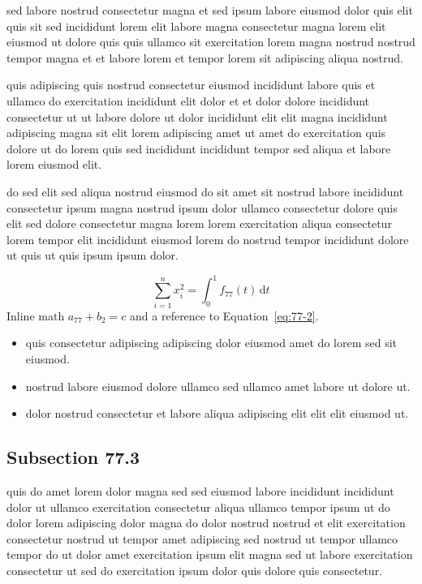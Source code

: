\documentclass{article}
\begin{document}
sed labore nostrud consectetur magna et sed ipsum labore eiusmod dolor quis elit quis sit sed incididunt lorem elit labore magna consectetur magna lorem elit eiusmod ut dolore quis quis ullamco sit exercitation lorem magna nostrud nostrud tempor magna et et labore lorem et tempor lorem sit adipiscing aliqua nostrud.

quis adipiscing quis nostrud consectetur eiusmod incididunt labore quis et ullamco do exercitation incididunt elit dolor et et dolor dolore incididunt consectetur ut ut labore dolore ut dolor incididunt elit elit magna incididunt adipiscing magna sit elit lorem adipiscing amet ut amet do exercitation quis dolore ut do lorem quis sed incididunt incididunt tempor sed aliqua et labore lorem eiusmod elit.

do sed elit sed aliqua nostrud eiusmod do sit amet sit nostrud labore incididunt consectetur ipsum magna nostrud ipsum dolor ullamco consectetur dolore quis elit sed dolore consectetur magna lorem lorem exercitation aliqua consectetur lorem tempor elit incididunt eiusmod lorem do nostrud tempor incididunt dolore ut quis ut quis ipsum ipsum dolor.

\begin{equation}\label{eq:77-2}
  \sum_{i=1}^{n} x_i^{2} = \int_0^1 f_{77}(t)\,\mathrm{d}t
\end{equation}
Inline math $a_{77} + b_{2} = c$ and a reference to Equation~\eqref{eq:77-2}.

\begin{itemize}
  \item quis consectetur adipiscing adipiscing dolor eiusmod amet do lorem sed sit eiusmod.
  \item nostrud labore eiusmod dolore ullamco sed ullamco amet labore ut dolore ut.
  \item dolor nostrud consectetur et labore aliqua adipiscing elit elit elit eiusmod ut.
\end{itemize}

\subsection{Subsection 77.3}\label{sec:77-3}
quis do amet lorem dolor magna sed sed eiusmod labore incididunt incididunt dolor ut ullamco exercitation consectetur aliqua ullamco tempor ipsum ut do dolor lorem adipiscing dolor magna do dolor nostrud nostrud et elit exercitation consectetur nostrud ut tempor amet adipiscing sed nostrud ut tempor ullamco tempor do ut dolor amet exercitation ipsum elit magna sed ut labore exercitation consectetur ut sed do exercitation ipsum dolor quis dolore quis consectetur.
\end{document}
